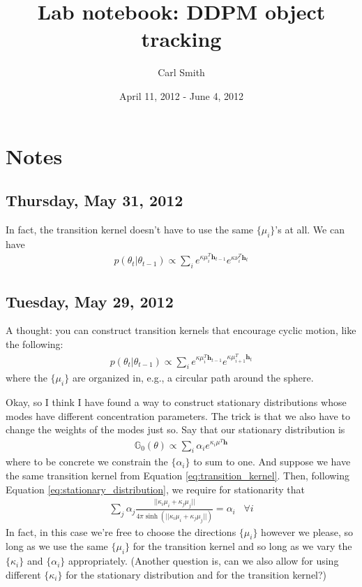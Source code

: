 \documentclass[11pt]{article}
\begin{document}
\title{Lab notebook: DDPM object tracking}
\author{Carl Smith}
\date{April 11, 2012 - June 4, 2012}
\maketitle

\section*{Notes}

\subsection*{Thursday, May 31, 2012}
In fact, the transition kernel doesn't have to use the same $\{\mu_i\}$'s at all. We can have
%
\begin{align*}
p(\theta_t|\theta_{t-1}) \propto \sum_i e^{\kappa \mu_i^T\mathbf{h}_{t-1}} e^{\kappa \nu_i^T \mathbf{h}_t}
\end{align*}

\subsection*{Tuesday, May 29, 2012}

A thought: you can construct transition kernels that encourage cyclic motion, like the following:
%
\begin{align*}
p(\theta_t|\theta_{t-1}) \propto \sum_i e^{\kappa \mu_i^T \mathbf{h}_{t-1}} e^{\kappa \mu_{i+1}^T \mathbf{h}_t}
\end{align*}
%
where the $\{\mu_i\}$ are organized in, e.g., a circular path around the sphere.

Okay, so I think I have found a way to construct stationary distributions whose modes have different concentration parameters. The trick is that we also have to change the weights of the modes just so. Say that our stationary distribution is
%
\begin{align*}
\mathbb{G}_0(\theta) \propto \sum_i \alpha_i e^{\kappa_i \mu^T \mathbf{h}}
\end{align*}
%
where to be concrete we constrain the $\{\alpha_i\}$ to sum to one. And suppose we have the same transition kernel from Equation \eqref{eq:transition_kernel}. Then, following Equation \eqref{eq:stationary_distribution}, we require for stationarity that
%
\begin{align*}
\sum_j \alpha_j \frac{||\kappa_i\mu_i + \kappa_j\mu_j||}{4\pi\sinh(||\kappa_i\mu_i+\kappa_j\mu_j||)} = \alpha_i \;\;\; \forall i
\end{align*}
%
In fact, in this case we're free to choose the directions $\{\mu_i\}$ however we please, so long as we use the same $\{\mu_i\}$ for the transition kernel and so long as we vary the $\{\kappa_i\}$ and $\{\alpha_i\}$ appropriately. (Another question is, can we also allow for using different $\{\kappa_i\}$ for the stationary distribution and for the transition kernel?)
\end{document}
